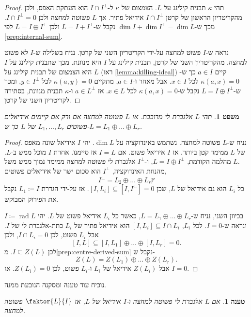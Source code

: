 \documentclass{report}
\theoremstyle{break}
\newtheorem{theorem}{משפט}[chapter]
\newtheorem{preposition}[preposition]{טענה}
\theoremstyle{MyNonumberbreak}
\newtheorem{proof}{הוכחה}
\DeclareMathOperator{\rad}{rad} %
\begin{document}
\begin{proof}
	תהי $\kappa$ תבנית קילינג על $L$. הצמצום של $\kappa$ ל-$I \cap I^\perp$ הוא העתקת האפס, ולכן מהקריטריון הראשון של קרטן $I \cap I^\perp$ אידיאל פתיר. אך $L$ פשוטה למחצה ולכן $I \cap I^\perp = 0$. מכך ש-$\dim I + \dim I^\perp = \dim L$ נקבל ש-$L = I + I^\perp$ ולכן $L = I \oplus I^\perp$ לפי \autoref*{prep:internal-sum}.
	
	נראה ש-$I$ פשוט למחצה על-ידי הקריטריון השני של קרטן. נניח בשלילה ש-$I$ לא פשוט למחצה. מהקריטריון השני של קרטן, תבנית קילינג על $I$ היא מנוונת. מכך שתבנית קילינג על $I$ היא הצמצום של תבנית קילינג על $L$ (ראו \autoref*{lemma:killing-ideal}) קיים $a \in I$ כך ש-$\kappa(a, x) = 0$ לכל $x \in I$. אבל מאחר ו-$a \in I$, מתקיים $\kappa(a, y) = 0$ לכל $y \in I^\perp$, ומכך ש-$L = I \oplus I^\perp$ נקבל ש-$\kappa(a, x) = 0$ לכל $x \in L$. אז $a \in L^\perp$ ו-$\kappa$ תבנית מנוונת, בסתירה לקריטריון השני של קרטן.
\end{proof}
\begin{theorem} \label{thm:semisimple-is-direct-sum}
	תהי $L$ אלגברת לי מרוכבת. אז $L$ פשוטה למחצה אם ורק אם קיימים אידיאלים פשוטים $L_1, \ldots, L_r$ של $L$ כך ש-$L = L_1 \oplus \ldots \oplus L_r$.
\end{theorem}
\begin{proof}
	נניח ש-$L$ פשוטה למחצה. נשתמש באינדוקציה על $\dim L$. יהי $I$ אידיאל שונה מאפס של $L$ ממימד קטן ביותר. אז $I$ אידיאל פשוט. אם $I = L$ אז סיימנו. אחרת $I$ מוכל ממש ב-$L$. מהלמה הקודמת, $L = I \oplus I^\perp$, ו-$I^\perp$ אלגברת לי פשוטה למחצה ממימד נמוך ממש משל $L$. \\
	מהנחת האינדוקציה, $I^\perp$ הוא סכום ישר של אידיאלים פשוטים,
	\[ I^\perp = L_2 \oplus \ldots \oplus L_rץ \]
	כל $L_i$ הוא גם אידיאל של $L$, שכן $[I, L_i] \subseteq [I, I^\perp] = 0$. אז על-ידי הגדרת $L_1 \coloneqq I$ נקבל את הפירוק המבוקש.
	
	בכיוון השני, נניח ש-$L = L_1 \oplus \ldots \oplus L_r$, כאשר כל $L_i$ אידיאל פשוט של $L$. יהי $I \coloneqq \rad L$ ונראה ש-$I = 0$. לכל $L_i$, $[I, L_i] \subseteq I \cap L_i$ הוא אידיאל פתיר של $L_i$ כתת-אלגברת לי של $I$. אבל $L_i$ פשוט, לכן $I \cap L_i = 0$, ולכן
	\[ [I, L] \subseteq [I, L_1] \oplus \ldots \oplus [I, L_r] = 0. \]
	לכן $I \subseteq Z(L)$. מ\autoref*{prep:centre-derived-sum} נקבל ש-
	\[ Z(L) = Z(L_1) \oplus \ldots \oplus Z(L_r). \]
	אבל $Z(L_i)$ אידיאל של $L_i$ ו-$L_i$ פשוט, לכן $Z(L_i) = 0$. אז $I = 0$.
\end{proof}
נוכיח עוד טענה ומסקנה הנובעת ממנה.
\begin{preposition} \label{prep:quotient-semismple}
	אם $L$ אלגברת לי פשוטה למחצה ו-$I$ אידיאל של $L$, אז $\faktor{L}{I}$ פשוטה למחצה.
\end{preposition}
\end{document}

